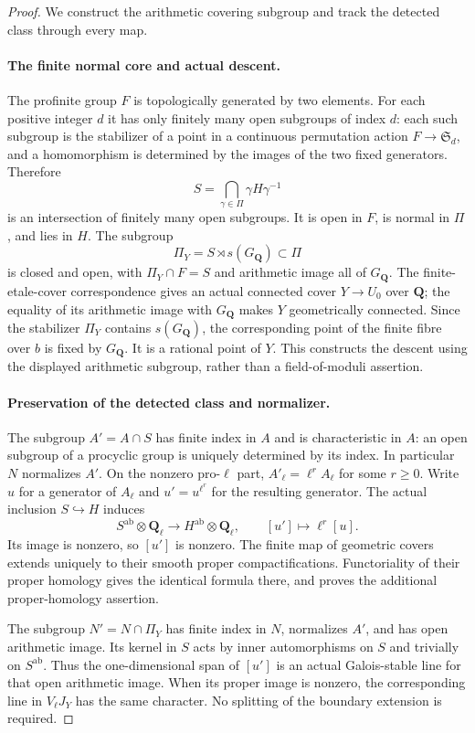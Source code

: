 \begin{proof}
We construct the arithmetic covering subgroup and track the detected class through every map.
\paragraph{The finite normal core and actual descent.}
The profinite group $F$ is topologically generated by two
elements. For each positive integer $d$ it has only finitely
many open subgroups of index $d$: each such subgroup is the
stabilizer of a point in a continuous permutation action
$F\to\mathfrak S_d$, and a homomorphism is determined by the
images of the two fixed generators. Therefore
\[
 S=\bigcap_{\gamma\in\Pi}\gamma H\gamma^{-1}
\]
is an intersection of finitely many open subgroups. It is
open in $F$, is normal in $\Pi$, and lies in $H$.
The subgroup
\[
 \Pi_Y=S\rtimes s(G_{\mathbf Q})\subset\Pi
\]
is closed and open, with $\Pi_Y\cap F=S$ and arithmetic image
all of $G_{\mathbf Q}$. The finite-etale-cover correspondence
gives an actual connected cover $Y\to U_0$ over $\mathbf Q$;
the equality of its arithmetic image with $G_{\mathbf Q}$
makes $Y$ geometrically connected. Since the stabilizer
$\Pi_Y$ contains $s(G_{\mathbf Q})$, the corresponding point
of the finite fibre over $b$ is fixed by $G_{\mathbf Q}$.
It is a rational point of $Y$. This constructs the descent
using the displayed arithmetic subgroup, rather than a
field-of-moduli assertion.

\paragraph{Preservation of the detected class and normalizer.}
The subgroup $A'=A\cap S$ has finite index in $A$ and is
characteristic in $A$: an open subgroup of a procyclic group
is uniquely determined by its index. In particular $N$
normalizes $A'$. On the nonzero pro-$\ell$ part,
$A'_\ell=\ell^r A_\ell$ for some $r\geq0$. Write $u$ for
a generator of $A_\ell$ and $u'=u^{\ell^r}$ for the resulting
generator. The actual inclusion $S\hookrightarrow H$ induces
\[
 S^{\mathrm{ab}}\otimes\mathbf Q_\ell
 \longrightarrow H^{\mathrm{ab}}\otimes\mathbf Q_\ell,
 \qquad [u']\longmapsto\ell^r[u].
\]
Its image is nonzero, so $[u']$ is nonzero. The finite map of
geometric covers extends uniquely to their smooth proper
compactifications. Functoriality of their proper homology
gives the identical formula there, and proves the additional
proper-homology assertion.

The subgroup $N'=N\cap\Pi_Y$ has finite index in $N$,
normalizes $A'$, and has open arithmetic image. Its kernel
in $S$ acts by inner automorphisms on $S$ and trivially on
$S^{\mathrm{ab}}$. Thus the one-dimensional span of $[u']$
is an actual Galois-stable line for that open arithmetic
image. When its proper image is nonzero, the corresponding
line in $V_\ell J_Y$ has the same character. No splitting of
the boundary extension is required.


\end{proof}
